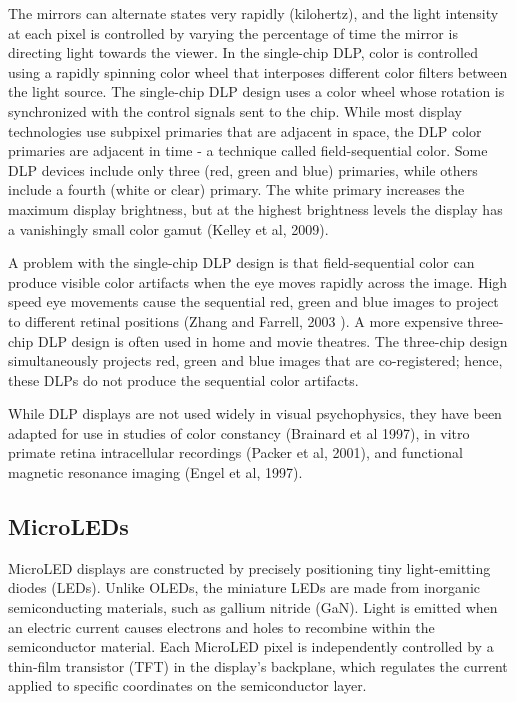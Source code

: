 \documentclass[
  letterpaper,
]{book}
\begin{document}
The mirrors can alternate states very rapidly (kilohertz), and the light
intensity at each pixel is controlled by varying the percentage of time
the mirror is directing light towards the viewer. In the single-chip
DLP, color is controlled using a rapidly spinning color wheel that
interposes different color filters between the light source. The
single-chip DLP design uses a color wheel whose rotation is synchronized
with the control signals sent to the chip. While most display
technologies use subpixel primaries that are adjacent in space, the DLP
color primaries are adjacent in time - a technique called
field-sequential color. Some DLP devices include only three (red, green
and blue) primaries, while others include a fourth (white or clear)
primary. The white primary increases the maximum display brightness, but
at the highest brightness levels the display has a vanishingly small
color gamut (Kelley et al, 2009).

A problem with the single-chip DLP design is that field-sequential color
can produce visible color artifacts when the eye moves rapidly across
the image. High speed eye movements cause the sequential red, green and
blue images to project to different retinal positions (Zhang and
Farrell, 2003 ). A more expensive three-chip DLP design is often used in
home and movie theatres. The three-chip design simultaneously projects
red, green and blue images that are co-registered; hence, these DLPs do
not produce the sequential color artifacts.

While DLP displays are not used widely in visual psychophysics, they
have been adapted for use in studies of color constancy (Brainard et al
1997), in vitro primate retina intracellular recordings (Packer et al,
2001), and functional magnetic resonance imaging (Engel et al, 1997).

\subsection{MicroLEDs}\label{microleds}

MicroLED displays are constructed by precisely positioning tiny
light-emitting diodes (LEDs). Unlike OLEDs, the miniature LEDs are made
from inorganic semiconducting materials, such as gallium nitride (GaN).
Light is emitted when an electric current causes electrons and holes to
recombine within the semiconductor material. Each MicroLED pixel is
independently controlled by a thin-film transistor (TFT) in the
display's backplane, which regulates the current applied to specific
coordinates on the semiconductor layer.
\end{document}
